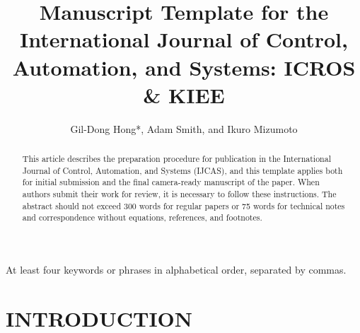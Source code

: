 \documentclass{IJCAS}
\begin{document}
\title{Manuscript Template for the International Journal of Control, Automation, and Systems: ICROS \& KIEE}

\author{Gil-Dong Hong*, Adam Smith, and Ikuro Mizumoto}

\begin{abstract}
This article describes the preparation procedure for publication in the International Journal of Control, Automation, and Systems (IJCAS), and this template applies both for initial submission and the final camera-ready manuscript of the paper. When authors submit their work for review, it is necessary to follow these instructions. The abstract should not exceed 300 words for regular papers or 75 words for technical notes and correspondence without equations, references, and footnotes.
\end{abstract}

\begin{keywords}
At least four keywords or phrases in alphabetical order, separated by commas.
\end{keywords}

\maketitle






\section{INTRODUCTION}
\end{document}

